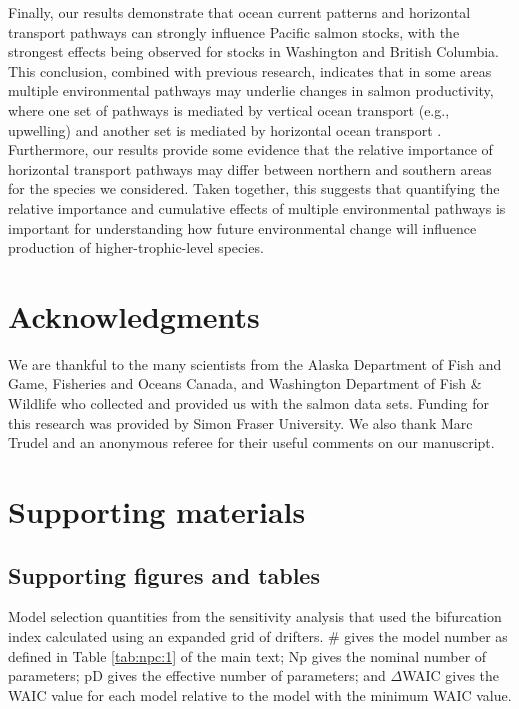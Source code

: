 Finally, our results demonstrate that ocean current patterns and horizontal
transport pathways can strongly influence Pacific salmon stocks, with the
strongest effects being observed for stocks in Washington and British Columbia.
This conclusion, combined with previous research, indicates that in some areas
multiple environmental pathways may underlie changes in salmon productivity,
where one set of pathways is mediated by vertical ocean transport (e.g.,
upwelling) and another set is mediated by horizontal ocean transport
\citep{Ottersen2010a, Malick2015b, DiLorenzo2013b}. Furthermore, our results
provide some evidence that the relative importance of horizontal transport
pathways may differ between northern and southern areas for the species we
considered. Taken together, this suggests that quantifying the relative
importance and cumulative effects of multiple environmental pathways is
important for understanding how future environmental change will influence
production of higher-trophic-level species.



\section{Acknowledgments}

We are thankful to the many scientists from the Alaska Department of Fish and
Game, Fisheries and Oceans Canada, and Washington Department of Fish \& Wildlife
who collected and provided us with the salmon data sets. Funding for this
research was provided by Simon Fraser University. We also thank Marc Trudel and
an anonymous referee for their useful comments on our manuscript.



\section{Supporting materials}

\subsection{Supporting figures and tables}


\begin{table}[!ht]
  \small \centering \libertineLF
  \caption[Model selection quantities for models fit with the bifurcation index
           calculated using an expanded grid of drifters]{Model selection
           quantities from the sensitivity analysis that used the bifurcation
           index calculated using an expanded grid of drifters. \# gives the
           model number as defined in Table \ref{tab:npc:1} of the main text; Np
           gives the nominal number of parameters; pD gives the effective number
           of parameters; and $\Delta$WAIC gives the WAIC value for each model
           relative to the model with the minimum WAIC value.}
  
  \label{tab:npc:s1}
\end{table}



